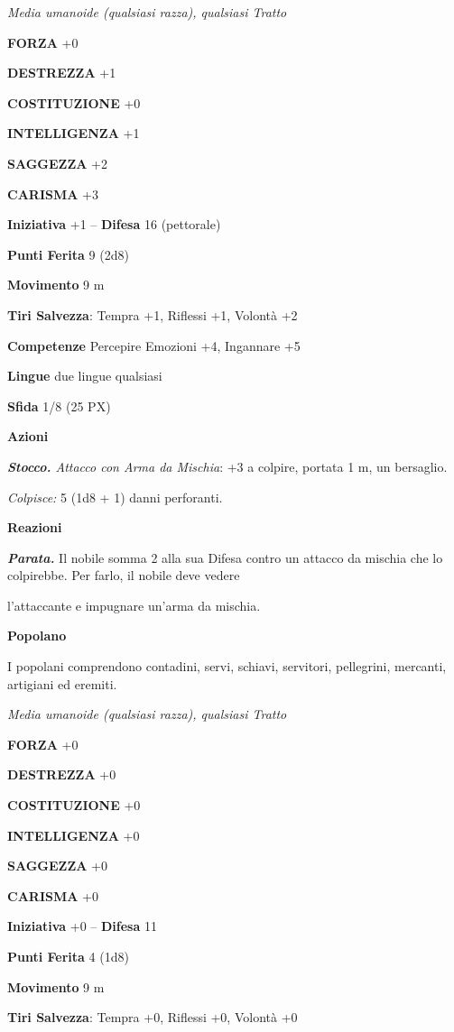 \begin{multicols}{2}
\textit{Media umanoide (qualsiasi razza), qualsiasi Tratto}

\textbf{FORZA} +0

\textbf{DESTREZZA} +1

\textbf{COSTITUZIONE} +0

\textbf{INTELLIGENZA} +1

\textbf{SAGGEZZA} +2

\textbf{CARISMA} +3

\textbf{Iniziativa} +1 -- \textbf{Difesa} 16 (pettorale)

\textbf{Punti Ferita} 9 (2d8)

\textbf{Movimento} 9 m

\textbf{Tiri Salvezza}: Tempra +1, Riflessi +1, Volontà +2

\textbf{Competenze} Percepire Emozioni +4, Ingannare +5

\textbf{Lingue} due lingue qualsiasi

\textbf{Sfida} 1/8 (25 PX)

\textbf{Azioni}

\textit{\textbf{Stocco.} Attacco con Arma da Mischia}: +3 a colpire, portata 1 m, un bersaglio.

\textit{Colpisce:} 5 (1d8 + 1) danni perforanti.

\textbf{Reazioni}

\textit{\textbf{Parata.}} Il nobile somma 2 alla sua Difesa contro un attacco da mischia che lo colpirebbe. Per farlo, il nobile deve vedere

l'attaccante e impugnare un'arma da mischia.

\medskip\textbf{Popolano}

I popolani comprendono contadini, servi, schiavi, servitori, pellegrini, mercanti, artigiani ed eremiti.

\textit{Media umanoide (qualsiasi razza), qualsiasi Tratto}

\textbf{FORZA} +0

\textbf{DESTREZZA} +0

\textbf{COSTITUZIONE} +0

\textbf{INTELLIGENZA} +0

\textbf{SAGGEZZA} +0

\textbf{CARISMA} +0

\textbf{Iniziativa} +0 -- \textbf{Difesa} 11

\textbf{Punti Ferita} 4 (1d8)

\textbf{Movimento} 9 m

\textbf{Tiri Salvezza}: Tempra +0, Riflessi +0, Volontà +0


\end{multicols}
